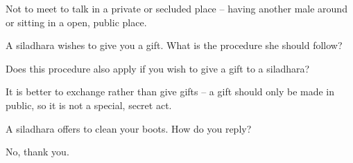 \begin{solution}
  Not to meet to talk in a private or secluded place – having another male
  around or sitting in a open, public place.
\end{solution}

\bigskip

A siladhara wishes to give you a gift. What is the procedure she should follow?

\bigskip

Does this procedure also apply if you wish to give a gift to a siladhara?

\begin{solution}
  It is better to exchange rather than give gifts – a gift should only be
  made in public, so it is not a special, secret act.
\end{solution}

\bigskip

A siladhara offers to clean your boots. How do you reply?

\begin{solution}
  No, thank you.
\end{solution}


